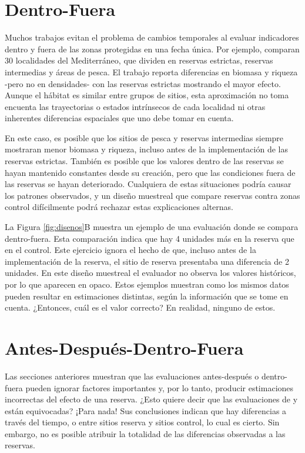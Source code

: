 \documentclass[]{krantz}
\begin{document}
\hypertarget{dentro-fuera}{%
\section{Dentro-Fuera}\label{dentro-fuera}}

Muchos trabajos evitan el problema de cambios temporales al evaluar indicadores dentro y fuera de las zonas protegidas en una fecha única. Por ejemplo, \citet{guidetti_2014} comparan 30 localidades del Mediterráneo, que dividen en reservas estrictas, reservas intermedias y áreas de pesca. El trabajo reporta diferencias en biomasa y riqueza -pero no en densidades- con las reservas estrictas mostrando el mayor efecto. Aunque el hábitat es similar entre grupos de sitios, esta aproximación no toma encuenta las trayectorias o estados intrínsecos de cada localidad ni otras inherentes diferencias espaciales que uno debe tomar en cuenta.

En este caso, es posible que los sitios de pesca y reservas intermedias siempre mostraran menor biomasa y riqueza, incluso antes de la implementación de las reservas estrictas. También es posible que los valores dentro de las reservas se hayan mantenido constantes desde su creación, pero que las condiciones fuera de las reservas se hayan deteriorado. Cualquiera de estas situaciones podría causar los patrones observados, y un diseño muestreal que compare reservas contra zonas control difícilmente podrá rechazar estas explicaciones alternas.

La Figura \ref{fig:disenos}B muestra un ejemplo de una evaluación donde se compara dentro-fuera. Esta comparación indica que hay 4 unidades más en la reserva que en el control. Este ejercicio ignora el hecho de que, incluso antes de la implementación de la reserva, el sitio de reserva presentaba una diferencia de 2 unidades. En este diseño muestreal el evaluador no observa los valores históricos, por lo que aparecen en opaco. Estos ejemplos muestran como los mismos datos pueden resultar en estimaciones distintas, según la información que se tome en cuenta. ¿Entonces, cuál es el valor correcto? En realidad, ninguno de estos.

\hypertarget{antes-despues-dentro-fuera}{%
\section{Antes-Después-Dentro-Fuera}\label{antes-despues-dentro-fuera}}

Las secciones anteriores muestran que las evaluaciones antes-después o dentro-fuera pueden ignorar factores importantes y, por lo tanto, producir estimaciones incorrectas del efecto de una reserva. ¿Esto quiere decir que las evaluaciones de \citet{wantiez_1997} y \citet{guidetti_2014} están equivocadas? ¡Para nada! Sus conclusiones indican que hay diferencias a través del tiempo, o entre sitios reserva y sitios control, lo cual es cierto. Sin embargo, no es posible atribuir la totalidad de las diferencias observadas a las reservas.
\end{document}
